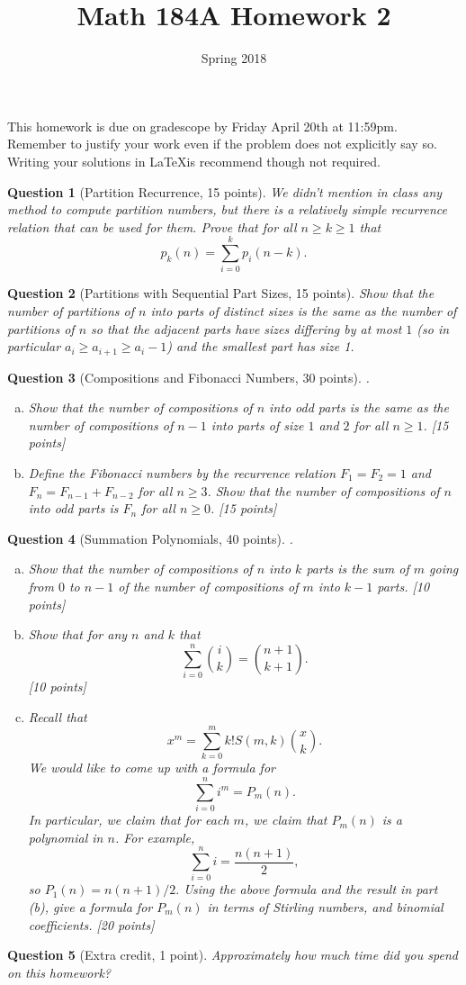 \documentclass{article}
\title{Math 184A Homework 2}
\date{Spring 2018}
\newtheorem{ques}{Question}
\begin{document}
\maketitle

This homework is due on gradescope by Friday April 20th at 11:59pm. Remember to justify your work even if the problem does not explicitly say so. Writing your solutions in \LaTeX is recommend though not required.

\begin{ques}[Partition Recurrence, 15 points]
We didn't mention in class any method to compute partition numbers, but there is a relatively simple recurrence relation that can be used for them. Prove that for all $n\geq k \geq 1$ that
$$
p_k(n) = \sum_{i=0}^k p_i(n-k).
$$
\end{ques}

\begin{ques}[Partitions with Sequential Part Sizes, 15 points]
Show that the number of partitions of $n$ into parts of distinct sizes is the same as the number of partitions of $n$ so that the adjacent parts have sizes differing by at most $1$ (so in particular $a_i \geq a_{i+1} \geq a_i-1$) and the smallest part has size 1.
\end{ques}

\begin{ques}[Compositions and Fibonacci Numbers, 30 points]
.

\begin{enumerate}[(a)]
\item Show that the number of compositions of $n$ into odd parts is the same as the number of compositions of $n-1$ into parts of size $1$ and $2$ for all $n\geq 1$. [15 points]
\item Define the Fibonacci numbers by the recurrence relation $F_1=F_2=1$ and $F_n=F_{n-1}+F_{n-2}$ for all $n\geq 3$. Show that the number of compositions of $n$ into odd parts is $F_n$ for all $n\geq 0$. [15 points]
\end{enumerate}
\end{ques}

\begin{ques}[Summation Polynomials, 40 points]
.

\begin{enumerate}[(a)]
\item Show that the number of compositions of $n$ into $k$ parts is the sum of $m$ going from $0$ to $n-1$ of the number of compositions of $m$ into $k-1$ parts. [10 points]
\item Show that for any $n$ and $k$ that
$$
\sum_{i=0}^n \binom{i}{k} = \binom{n+1}{k+1}.
$$
[10 points]
\item Recall that
$$
x^m = \sum_{k=0}^m k! S(m,k) \binom{x}{k}.
$$
We would like to come up with a formula for
$$
\sum_{i=0}^n i^m = P_m(n).
$$
In particular, we claim that for each $m$, we claim that $P_m(n)$ is a polynomial in $n$. For example,
$$
\sum_{i=0}^n i = \frac{n(n+1)}{2},
$$
so $P_1(n) = n(n+1)/2.$ Using the above formula and the result in part (b), give a formula for $P_m(n)$ in terms of Stirling numbers, and binomial coefficients. [20 points]
\end{enumerate}
\end{ques}

\begin{ques}[Extra credit, 1 point]
Approximately how much time did you spend on this homework?
\end{ques}
\end{document}

